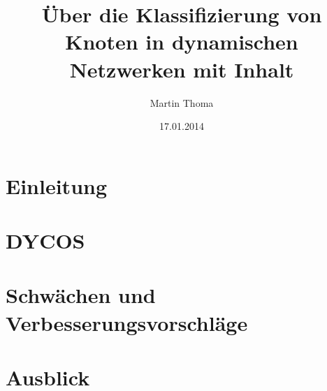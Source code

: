 \documentclass[runningheads]{llncs}
\begin{document}
\mainmatter
\title{Über die Klassifizierung von Knoten in dynamischen Netzwerken mit Inhalt}
\author{Martin Thoma}
\date{17.01.2014}
\maketitle

\begin{abstract}%

\end{abstract}

\section{Einleitung}


\section{DYCOS}


\section{Schwächen und Verbesserungsvorschläge}


\section{Ausblick}


%


\end{document}
